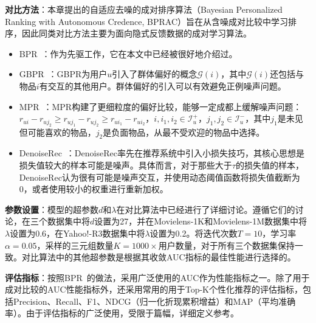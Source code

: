 \textbf{对比方法}：本章提出的自适应去噪的成对排序算法（Bayesian Personalized Ranking with Autonomous Credence, BPRAC）旨在从含噪成对比较中学习排序，因此同类对比方法主要为面向隐式反馈数据的成对学习算法。
\begin{itemize}
\item \textsf{BPR}~\cite{Steffen:2009:UAI}：作为先驱工作，它在本文中已经被很好地介绍过。
\item \textsf{GBPR}~\cite{Weike:2013:IJCAI}：GBPR为用户$u$引入了群体偏好的概念$\mathcal{G}(i)$，其中$\mathcal{G}(i)$还包括与物品$i$有交互的其他用户。群体偏好的引入可以有效避免正例噪声问题。
\item \textsf{MPR}~\cite{Yu:2018:CIKM}：MPR构建了更细粒度的偏好比较，能够一定成都上缓解噪声问题：$r_{ui} - r_{uj_2} \geq r_{uj_1} - r_{uj_2} \geq r_{ui_1} - r_{ui_2}$，$i,i_1,i_2 \in \mathcal{I}_u^+$，$j_1, j_2 \in \mathcal{I}_u^-$，其中$j_1$是未见但可能喜欢的物品，$j_2$是负面物品，从最不受欢迎的物品中选择。
\item \textsf{DenoiseRec}~\cite{Wang:2021:WSDM}：DenoiseRec率先在推荐系统中引入小损失技巧，其核心思想是损失值较大的样本可能是噪声。具体而言，对于那些大于$\tau$的损失值的样本，DenoiseRec认为很有可能是噪声交互，并使用动态阈值函数将损失值截断为0，或者使用较小的权重进行重新加权。
\end{itemize}

\textbf{参数设置}：模型的超参数$d$和$\lambda$在对比算法中已经进行了详细讨论\cite{Steffen:2009:UAI,Weike:2013:IJCAI,Yu:2018:CIKM}。遵循它们的讨论，在三个数据集中将$d$设置为27，并在Movielens-1K和Movielens-1M数据集中将$\lambda$设置为0.6，在Yahoo!-R3数据集中将$\lambda$设置为0.2。将迭代次数$T=10$，学习率$\alpha=0.05$，采样的三元组数量$K=1000 \times$用户数量，对于所有三个数据集保持一致。对比算法中的其他超参数是根据其收敛AUC指标的最佳性能进行选择的。

\textbf{评估指标}：按照BPR~\cite{Steffen:2009:UAI}的做法，采用广泛使用的AUC作为性能指标之一。除了用于成对比较的AUC性能指标外，还采用常用的用于Top-K个性化推荐的评估指标，包括Precision、Recall、F1、NDCG（归一化折现累积增益）和MAP（平均准确率）。由于评估指标的广泛使用，受限于篇幅，详细定义参考\cite{ml:2018}。

